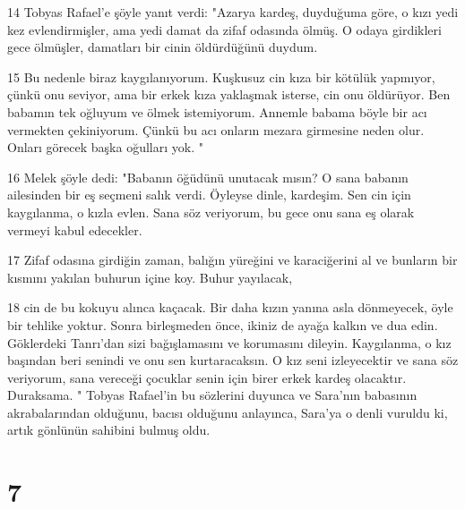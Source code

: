 \par 14 Tobyas Rafael'e şöyle yanıt verdi: "Azarya kardeş, duyduğuma göre, o kızı yedi kez evlendirmişler, ama yedi damat da zifaf odasında ölmüş. O odaya girdikleri gece ölmüşler, damatları bir cinin öldürdüğünü duydum.
\par 15 Bu nedenle biraz kaygılanıyorum. Kuşkusuz cin kıza bir kötülük yapmıyor, çünkü onu seviyor, ama bir erkek kıza yaklaşmak isterse, cin onu öldürüyor. Ben babamın tek oğluyum ve ölmek istemiyorum. Annemle babama böyle bir acı vermekten çekiniyorum. Çünkü bu acı onların mezara girmesine neden olur. Onları görecek başka oğulları yok. "
\par 16 Melek şöyle dedi: "Babanın öğüdünü unutacak mısın? O sana babanın ailesinden bir eş seçmeni salık verdi. Öyleyse dinle, kardeşim. Sen cin için kaygılanma, o kızla evlen. Sana söz veriyorum, bu gece onu sana eş olarak vermeyi kabul edecekler.
\par 17 Zifaf odasına girdiğin zaman, balığın yüreğini ve karaciğerini al ve bunların bir kısmını yakılan buhurun içine koy. Buhur yayılacak,
\par 18 cin de bu kokuyu alınca kaçacak. Bir daha kızın yanına asla dönmeyecek, öyle bir tehlike yoktur. Sonra birleşmeden önce, ikiniz de ayağa kalkın ve dua edin. Göklerdeki Tanrı'dan sizi bağışlamasını ve korumasını dileyin. Kaygılanma, o kız başından beri senindi ve onu sen kurtaracaksın. O kız seni izleyecektir ve sana söz veriyorum, sana vereceği çocuklar senin için birer erkek kardeş olacaktır. Duraksama. " Tobyas Rafael'in bu sözlerini duyunca ve Sara'nın babasının akrabalarından olduğunu, bacısı olduğunu anlayınca, Sara'ya o denli vuruldu ki, artık gönlünün sahibini bulmuş oldu.

\chapter{7}

